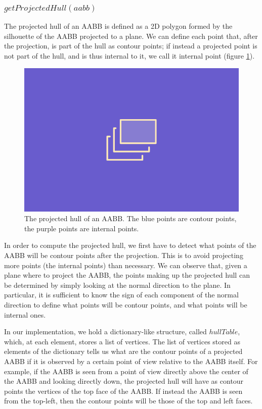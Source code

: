 \documentclass{PoliMi_MasterThesis}
\begin{document}
\subsubsection*{$getProjectedHull(aabb)$} \label{ssec:parallel_getProjectedHull}
The projected hull of an AABB is defined as a 2D polygon formed by the silhouette of the AABB projected to a plane. We can define each point that, after the projection, is part of the hull as contour points; if instead a projected point is not part of the hull, and is thus internal to it, we call it internal point (figure \ref{fig:aabb_ortho_hull}). 

\begin{figure}[H]
	\centering
	\includegraphics[width=\textwidth*\real{0.6}]{Images/TODO.png}
	\caption{The projected hull of an AABB. The blue points are contour points, the purple points are internal points.}
	\label{fig:aabb_ortho_hull}
\end{figure}

In order to compute the projected hull, we first have to detect what points of the AABB will be contour points after the projection. This is to avoid projecting more points (the internal points) than necessary. We can observe that, given a plane where to project the AABB, the points making up the projected hull can be determined by simply looking at the normal direction to the plane. In particular, it is sufficient to know the sign of each component of the normal direction to define what points will be contour points, and what points will be internal ones.

In our implementation, we hold a dictionary-like structure, called $hullTable$, which, at each element, stores a list of vertices. The list of vertices stored as elements of the dictionary tells us what are the contour points of a projected AABB if it is observed by a certain point of view relative to the AABB itself. For example, if the AABB is seen from a point of view directly above the center of the AABB and looking directly down, the projected hull will have as contour points the vertices of the top face of the AABB. If instead the AABB is seen from the top-left, then the contour points will be those of the top and left faces.
\end{document}
